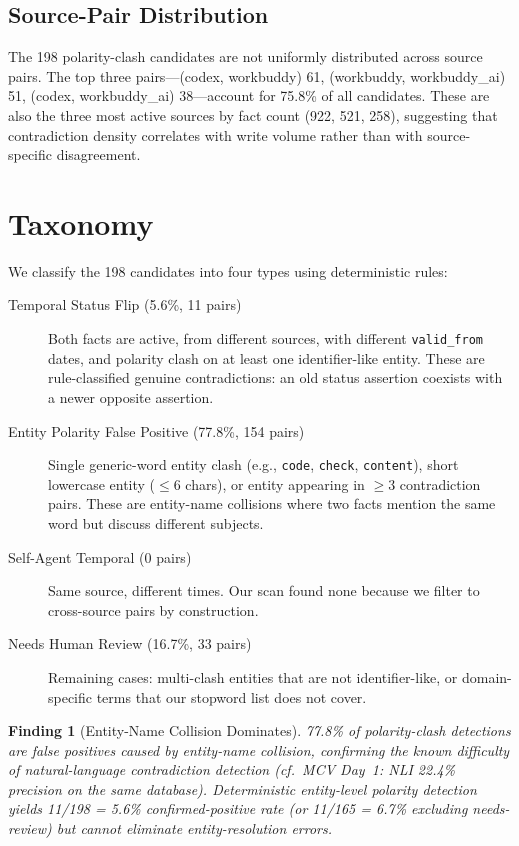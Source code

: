 \documentclass{article}
\newtheorem{finding}{Finding}
\begin{document}
\subsection{Source-Pair Distribution}
The 198 polarity-clash candidates are not uniformly distributed across source pairs. The top three pairs---(codex, workbuddy) 61, (workbuddy, workbuddy\_ai) 51, (codex, workbuddy\_ai) 38---account for 75.8\% of all candidates. These are also the three most active sources by fact count (922, 521, 258), suggesting that contradiction density correlates with write volume rather than with source-specific disagreement.

\section{Taxonomy}
\label{sec:taxonomy}

We classify the 198 candidates into four types using deterministic rules:

\begin{description}
\item[Temporal Status Flip (5.6\%, 11 pairs)] Both facts are active, from different sources, with different \texttt{valid\_from} dates, and polarity clash on at least one identifier-like entity. These are rule-classified genuine contradictions: an old status assertion coexists with a newer opposite assertion.
\item[Entity Polarity False Positive (77.8\%, 154 pairs)] Single generic-word entity clash (e.g., \texttt{code}, \texttt{check}, \texttt{content}), short lowercase entity ($\leq 6$ chars), or entity appearing in $\geq 3$ contradiction pairs. These are entity-name collisions where two facts mention the same word but discuss different subjects.
\item[Self-Agent Temporal (0 pairs)] Same source, different times. Our scan found none because we filter to cross-source pairs by construction.
\item[Needs Human Review (16.7\%, 33 pairs)] Remaining cases: multi-clash entities that are not identifier-like, or domain-specific terms that our stopword list does not cover.
\end{description}

\begin{finding}[Entity-Name Collision Dominates]
77.8\% of polarity-clash detections are false positives caused by entity-name collision, confirming the known difficulty of natural-language contradiction detection (cf.~MCV Day~1: NLI 22.4\% precision on the same database). Deterministic entity-level polarity detection yields 11/198 = 5.6\% confirmed-positive rate (or 11/165 = 6.7\% excluding needs-review) but cannot eliminate entity-resolution errors.
\end{finding}
\end{document}
